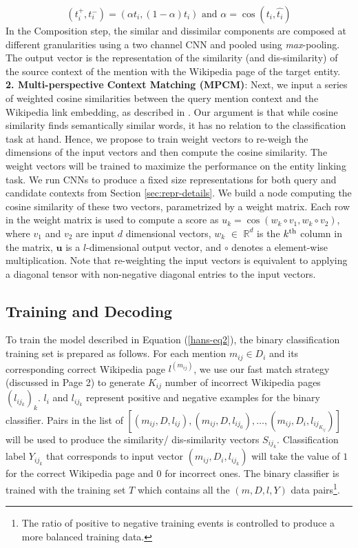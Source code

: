 \documentclass[letterpaper]{article} \usepackage{aaai18}  \usepackage{times}  \usepackage{helvet}  \usepackage{courier}  \usepackage{url}  \usepackage{graphicx}  \frenchspacing  \setlength{\pdfpagewidth}{8.5in}  \setlength{\pdfpageheight}{11in}  \usepackage{latexsym}
\DeclareMathOperator{\cosine}{cos}
\newcommand{\wpfi}{t}
\begin{document}
\begin{equation*}
(\wpfi{}_i^{+},\wpfi{}_i^{-})=(\alpha \wpfi{}_i, (1-\alpha) \wpfi{}_i) \mbox{ and } \alpha = \cosine(\wpfi{}_i,\hat{\wpfi{}_i})
\end{equation*}
In the Composition step, the similar and dissimilar components are composed at different granularities using a two channel CNN and pooled using \textit{max}-pooling. The output vector is the representation of the similarity (and dis-similarity) of the source context of the mention with the Wikipedia page of the target entity.\\
\textbf{2. Multi-perspective Context Matching (MPCM)}: Next, we input a series of weighted cosine similarities between the query mention context and the Wikipedia link embedding, as described in \cite{wang2016multi}. Our argument is that while cosine similarity finds semantically similar words, it has no relation to the classification task at hand. Hence, we propose to train weight vectors to re-weigh the dimensions of the input vectors and then compute the cosine similarity. The weight vectors will be trained to maximize the performance on the entity linking task.
We run CNNs to produce a fixed size representations for both query and candidate contexts from Section \ref{sec:repr-details}. We build a node computing the cosine similarity of these two vectors, parametrized by a weight matrix. Each row in the weight matrix is used to compute a score as $u_k = \cosine(w_k \circ v_1, w_k \circ v_2)$, where $v_1$ and $v_2$ are input $d$ dimensional vectors, $w_k$ $\in$ $\mathbb{R}^{d}$ is the $k^{\textnormal{th}}$ column in the matrix, $\mathbf{u}$ is a $l$-dimensional output vector, and $\circ$ denotes a element-wise multiplication. Note that re-weighting the input vectors is equivalent to applying a diagonal tensor with non-negative diagonal entries to the input vectors.\\
\subsection{Training and Decoding}
To train the model described in Equation (\ref{hans-eq2}), the binary classification training set is prepared as follows. For each mention $m_{ij}\in D_i$ and its corresponding correct Wikipedia page $l^{(m_{ij})}$, we use our fast match strategy (discussed in Page 2) to generate $K_{ij}$ number of incorrect Wikipedia pages $(l_{ij_k})_k$. $l_i$ and $l_{ij_k}$ represent positive and negative examples for the binary classifier. Pairs in the list of $[(m_{ij},D,l_{ij}),(m_{ij},D,l_{ij_0}),\ldots,(m_{ij},D_i,l_{ij_{K_{ij}}})]$ will be used to produce the similarity/ dis-similarity vectors $S_{ij_k}$. Classification label $Y_{ij_k}$ that corresponds to input vector $(m_{ij},D_{i},l_{ij_k})$ will take the value of $1$ for the correct Wikipedia page and $0$ for incorrect ones. The binary classifier is trained with the training set $T$ which contains all the $(m,D,l,Y)$ data pairs\footnote{The ratio of positive to negative training events is controlled  to produce a more balanced training data.}. 
\end{document}
